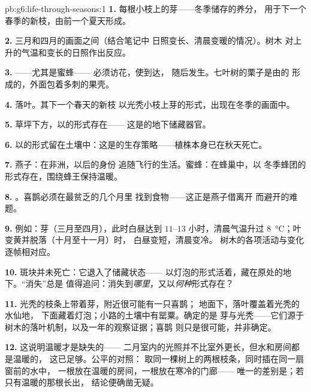 \begin{solution}{pb:g6:life-through-seasons:1}
\textbf{1.} 每根小枝上的芽——冬季储存的养分，
用于下一个春季的新枝，由前一个夏天形成。

\textbf{2.} 三月和四月的画面之间（结合笔记中
日照变长、清晨变暖的情况）。树木
对上升的气温和变长的日照作出反应。

\textbf{3.} ——尤其是蜜蜂——
必须访花，使到达，
随后发生。七叶树的栗子是由的
形成的，外面包着多刺的果壳。

\textbf{4.} 落叶。其下一个春天的新枝
以光秃小枝上芽的形式，出现在冬季的画面中。

\textbf{5.} 草坪下方，以的形式存在——
这是的地下储藏器官。

\textbf{6.} 以的形式留在土壤中：这是的生存策略——植株本身已在秋天死亡。

\textbf{7.} 燕子：在非洲，以后的身份
追随飞行的生活。蜜蜂：在蜂巢中，以
冬季蜂团的形式存在，围绕蜂王保持温暖。

\textbf{8.} 。喜鹊必须在最贫乏的几个月里
找到食物——这正是燕子借离开
而避开的难题。

\textbf{9.} 例如：芽（三月至四月），此时白昼达到
$11$--$13$ 小时，清晨气温升过
\qty{8}{\degreeCelsius}；叶变黄并脱落（十月至十一月）时，
白昼变短，清晨变冷。
树木的各项活动与变化逐帧相对应。

\textbf{10.} 斑块并未死亡：它退入了储藏状态——
以灯泡的形式活着，藏在原处的地下。“消失”总是
值得追问：消失到\emph{哪里}，又以\emph{何种}形式存在？

\textbf{11.} 光秃的枝条上带着芽，附近很可能有一只喜鹊；
地面下，落叶覆盖着光秃的水仙地，
下面藏着灯泡；小路的土壤中有罂粟。确定的是
芽与光秃——它们源于
树木的落叶机制，以及一年的观察证据；喜鹊
则只是很可能，并非确定。

\textbf{12.} 这说明温暖才是缺失的——
二月室内的光照并不比室外更长，但水和房间都是温暖的，
这已足够。公平的对照：
取同一棵树上的两根枝条，同时插在同一扇窗前的水中，
一根放在温暖的房间，一根放在寒冷的门廊——
唯一的差别是；若只有温暖的那根长出，
结论便确凿无疑。
\end{solution}
